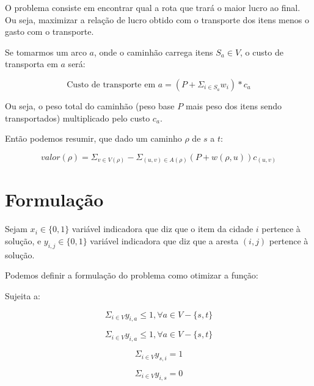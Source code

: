 \documentclass[conference]{IEEEtran}
\begin{document}
    O problema consiste em encontrar qual a rota que trará o maior lucro ao final. Ou seja, maximizar a relação de lucro obtido com o transporte dos itens menos o gasto com o transporte.

    Se tomarmos um arco $a$, onde o caminhão carrega itens $S_a \in V$, o custo de transporta em $a$ será:

    \begin{equation}
        \text{Custo de transporte em } a = (P + \Sigma_{i \in S_a} w_i) * c_a
    \end{equation}

    Ou seja, o peso total do caminhão (peso base $P$ mais peso dos itens sendo transportados) multiplicado pelo custo $c_a$.

    Então podemos resumir, que dado um caminho $\rho$ de $s$ a $t$:

    \begin{equation}
        valor(\rho) = \Sigma_{v \in V(\rho)} - \Sigma_{(u,v) \in A(\rho)} (P + w(\rho, u))c_{(u,v)}
    \end{equation}

\newpage
\section {Formulação}

    Sejam $x_i \in \{0, 1\}$ variável indicadora que diz que o item da cidade $i$ pertence à solução, e $y_{i,j} \in \{0, 1\}$ variável indicadora que diz que a aresta $(i,j)$ pertence à solução.

    Podemos definir a formulação do problema como otimizar a função:


    Sujeita a:

    \begin{equation}
        \Sigma_{i \in V} y_{i,a} \leq 1, \forall a \in V - \{s,t\}
        \label{1}
    \end{equation}

    \begin{equation}
        \Sigma_{i \in V} y_{i,a} \leq 1, \forall a \in V - \{s,t\}
        \label{2}
    \end{equation}

    \begin{equation}
        \Sigma_{i \in V} y_{s,i} = 1
        \label{s-out}
    \end{equation}

    \begin{equation}
        \Sigma_{i \in V} y_{i,s} = 0
        \label{s-in}
    \end{equation}
\end{document}
